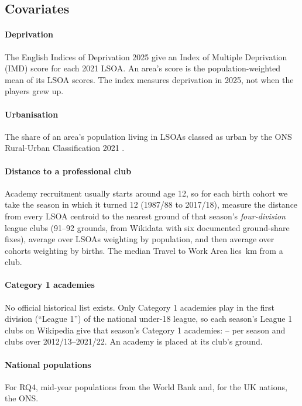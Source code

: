 \subsection{Covariates}
\label{sec:covariates}
\paragraph{Deprivation} The English Indices of Deprivation 2025 \cite{imd2025} give an Index of Multiple Deprivation (IMD) score for each 2021 LSOA. An area's score is the population-weighted mean of its LSOA scores. The index measures deprivation in 2025, not when the players grew up.

\paragraph{Urbanisation} The share of an area's population living in LSOAs classed as urban by the ONS Rural-Urban Classification 2021 \cite{onsgeo}.

\paragraph{Distance to a professional club} Academy recruitment usually starts around age 12, so for each birth cohort we take the season in which it turned 12 (1987/88 to 2017/18), measure the distance from every LSOA centroid to the nearest ground of that season's \emph{four-division} league clubs (91--92 grounds, from Wikidata with six documented ground-share fixes), average over LSOAs weighting by population, and then average over cohorts weighting by births. The median Travel to Work Area lies \distMedTTWA{}\,km from a club.

\paragraph{Category 1 academies} No official historical list exists. Only Category 1 academies play in the first division (``League 1'') of the national under-18 league, so each season's League 1 clubs on Wikipedia give that season's Category 1 academies: \acadPerSeasonLo{}--\acadPerSeasonHi{} per season and \nAcadClubs{} clubs over 2012/13--2021/22. An academy is placed at its club's ground.

\paragraph{National populations} For RQ4, mid-year populations from the World Bank \cite{worldbank} and, for the UK nations, the ONS.
